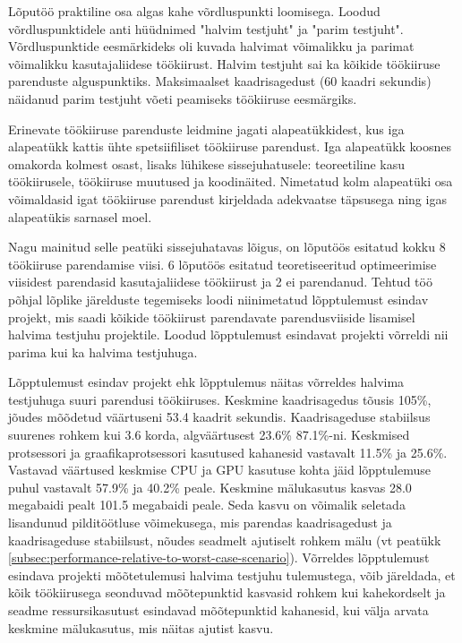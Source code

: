 \documentclass[a4paper,12pt]{article}
\begin{document}
Lõputöö praktiline osa algas kahe võrdluspunkti loomisega. Loodud võrdluspunktidele anti hüüdnimed "halvim testjuht" ja "parim testjuht". Võrdluspunktide eesmärkideks oli kuvada halvimat võimalikku ja parimat võimalikku kasutajaliidese töökiirust. Halvim testjuht sai ka kõikide töökiiruse parenduste alguspunktiks. Maksimaalset kaadrisagedust (60 kaadri sekundis) näidanud parim testjuht võeti peamiseks töökiiruse eesmärgiks.

Erinevate töökiiruse parenduste leidmine jagati alapeatükkidest, kus iga alapeatükk kattis ühte spetsiifiliset töökiiruse parendust. Iga alapeatükk koosnes omakorda kolmest osast, lisaks lühikese sissejuhatusele: teoreetiline kasu töökiirusele, töökiiruse muutused ja koodinäited. Nimetatud kolm alapeatüki osa võimaldasid igat töökiiruse parendust kirjeldada adekvaatse täpsusega ning igas alapeatükis sarnasel moel.

Nagu mainitud selle peatüki sissejuhatavas lõigus, on lõputöös esitatud kokku 8 töökiiruse parendamise viisi. 6 lõputöös esitatud teoretiseeritud optimeerimise viisidest parendasid kasutajaliidese töökiirust ja 2 ei parendanud. Tehtud töö põhjal lõplike järelduste tegemiseks loodi niinimetatud lõpptulemust esindav projekt, mis saadi kõikide töökiirust parendavate parendusviiside lisamisel halvima testjuhu projektile. Loodud lõpptulemust esindavat projekti võrreldi nii parima kui ka halvima testjuhuga.

Lõpptulemust esindav projekt ehk lõpptulemus näitas võrreldes halvima testjuhuga suuri parendusi töökiiruses. Keskmine kaadrisagedus tõusis 105\%, jõudes mõõdetud väärtuseni 53.4 kaadrit sekundis. Kaadrisageduse stabiilsus suurenes rohkem kui 3.6 korda, algväärtusest 23.6\% 87.1\%-ni. Keskmised protsessori ja graafikaprotsessori kasutused kahanesid vastavalt 11.5\% ja 25.6\%. Vastavad väärtused keskmise CPU ja GPU kasutuse kohta jäid lõpptulemuse puhul vastavalt 57.9\% ja 40.2\% peale. Keskmine mälukasutus kasvas 28.0 megabaidi pealt 101.5 megabaidi peale. Seda kasvu on võimalik seletada lisandunud pilditöötluse võimekusega, mis parendas kaadrisagedust ja kaadrisageduse stabiilsust, nõudes seadmelt ajutiselt rohkem mälu (vt peatükk \ref{subsec:performance-relative-to-worst-case-scenario}). Võrreldes lõpptulemust esindava projekti mõõtetulemusi halvima testjuhu tulemustega, võib järeldada, et kõik töökiirusega seonduvad mõõtepunktid kasvasid rohkem kui kahekordselt ja seadme ressursikasutust esindavad mõõtepunktid kahanesid, kui välja arvata keskmine mälukasutus, mis näitas ajutist kasvu.
\end{document}
